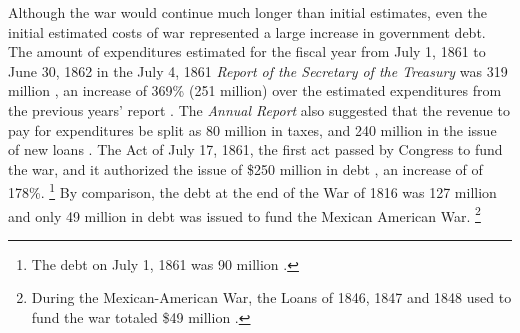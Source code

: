 Although the war would continue much longer than initial estimates, even the initial estimated costs of war represented a large increase in government debt.
The amount of expenditures estimated for the fiscal year from July 1, 1861 to June 30, 1862 in the July 4, 1861 \textit{Report of the Secretary of the Treasury} was 319 million \parencite[5]{Treasury1861a}, an increase of 369\% (251 million) over the estimated expenditures from the previous years' report \parencite[6]{Treasury1860}.
The \textit{Annual Report} also suggested that the revenue to pay for expenditures be split as 80 million in taxes, and 240 million in the issue of new loans  \parencite[6]{Treasury1861a}.
The Act of July 17, 1861, the first act passed by Congress to fund the war, and it authorized the issue of \$250 million in debt \parencite[44]{Treasury1863}, an increase of of 178\%.%
\footnote{The debt on July 1, 1861 was 90 million \parencite[23]{Treasury1861a}.}
By comparison, the debt at the end of the War of 1816 was 127 million \parencite[29]{Elder1863} and only 49 million in debt was issued to fund the Mexican American War.%
\footnote{During the Mexican-American War, the Loans of 1846, 1847 and 1848 used to fund the war totaled \$49 million \parencite[42]{Treasury1863}.}


